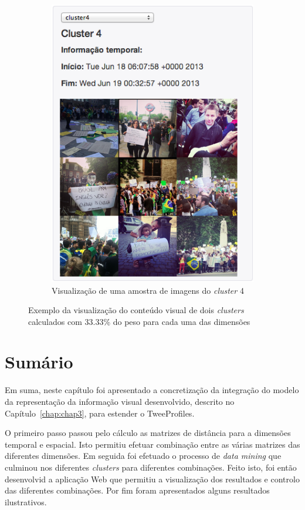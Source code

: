 \begin{figure}[t!]
\begin{subfigure}[b]{0.45\textwidth}
	\includegraphics[width=0.9\linewidth]{./figures/olhopassarinho/c4_ex1_im33_e33_t33_1819}
	\caption{ Visualização de uma amostra de imagens do \textit{cluster} 4 }
	\label{subfig:im42}
	\end{subfigure}
\caption{Exemplo da visualização do conteúdo visual de dois \textit{clusters} calculados com 33.33\% do peso para cada uma das dimensões}
\label{fig:im40}
\end{figure}


\section{Sumário}

Em suma, neste capítulo foi apresentado a concretização da integração do modelo da representação da informação visual desenvolvido, descrito no Capítulo~\ref{chap:chap3}, para estender o TweeProfiles. 

O primeiro passo passou pelo cálculo as matrizes de distância para a dimensões temporal e espacial. Isto permitiu efetuar combinação entre as várias matrizes das diferentes dimensões. Em seguida foi efetuado o processo de \textit{data mining} que culminou nos diferentes \textit{clusters} para diferentes combinações. Feito isto, foi então desenvolvid a aplicação Web que permitiu a visualização dos resultados e controlo das diferentes combinações. Por fim foram apresentados alguns resultados ilustrativos.

